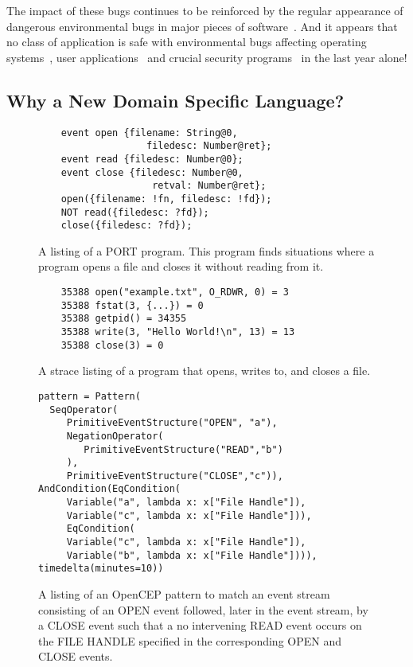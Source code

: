 The impact of these bugs continues to be reinforced by the regular
appearance of dangerous environmental bugs in major pieces of
software~\cite{devzeroroot}.  And it appears that no class of application
is safe with environmental bugs affecting operating
systems~\cite{ubuntuappaport},
user applications~\cite{westerndigitalsymlink} and crucial security
programs~\cite{sudocopy} in the
last year alone!


\subsection{Why a New Domain Specific Language?}
\begin{figure}
  \begin{lstlisting}
    event open {filename: String@0,
                   filedesc: Number@ret};
    event read {filedesc: Number@0};
    event close {filedesc: Number@0,
                    retval: Number@ret};
    open({filename: !fn, filedesc: !fd});
    NOT read({filedesc: ?fd});
    close({filedesc: ?fd});
  \end{lstlisting}
  \caption{A listing of a PORT program.  This program finds situations
  where a program opens a file and closes it without reading from it.}
  \label{fig:PORTListing}
\end{figure}

\begin{figure}
  \begin{lstlisting}
    35388 open("example.txt", O_RDWR, 0) = 3
    35388 fstat(3, {...}) = 0
    35388 getpid() = 34355
    35388 write(3, "Hello World!\n", 13) = 13
    35388 close(3) = 0
  \end{lstlisting}
  \caption{A strace listing of a program that opens, writes to, and closes
  a file.}
  \label{fig:StraceListing}
\end{figure}

\begin{figure}
  \begin{lstlisting}
pattern = Pattern(
  SeqOperator(
     PrimitiveEventStructure("OPEN", "a"),
     NegationOperator(
        PrimitiveEventStructure("READ","b")
     ),
     PrimitiveEventStructure("CLOSE","c")),
AndCondition(EqCondition(
     Variable("a", lambda x: x["File Handle"]),
     Variable("c", lambda x: x["File Handle"])),
     EqCondition(
     Variable("c", lambda x: x["File Handle"]),
     Variable("b", lambda x: x["File Handle"]))),
timedelta(minutes=10))
  \end{lstlisting}
  \caption{
    A listing of an OpenCEP pattern to match an event stream consisting of an OPEN event followed, later in the event stream, by a CLOSE event such that a no intervening READ event occurs on the FILE HANDLE specified in the corresponding OPEN and CLOSE events.
}
  \label{fig:OpenCEPListing}
\end{figure}


